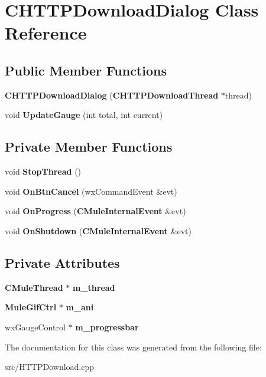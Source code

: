 \section{CHTTPDownloadDialog Class Reference}
\label{classCHTTPDownloadDialog}
\subsection*{Public Member Functions}
\begin{DoxyCompactItemize}
\item 
{\bfseries CHTTPDownloadDialog} ({\bf CHTTPDownloadThread} $\ast$thread)\label{classCHTTPDownloadDialog_a201947c2f3bcbb60b24ea949c01bcfc7}

\item 
void {\bfseries UpdateGauge} (int total, int current)\label{classCHTTPDownloadDialog_a53f214130b7fbd10adab705232944e73}

\end{DoxyCompactItemize}
\subsection*{Private Member Functions}
\begin{DoxyCompactItemize}
\item 
void {\bfseries StopThread} ()\label{classCHTTPDownloadDialog_aa8225bc54bb46089ce1eefecf2e7798e}

\item 
void {\bfseries OnBtnCancel} (wxCommandEvent \&evt)\label{classCHTTPDownloadDialog_a7e635d0a1f2bfa49fc7999e5d825c1f4}

\item 
void {\bfseries OnProgress} ({\bf CMuleInternalEvent} \&evt)\label{classCHTTPDownloadDialog_ae791676246cf8a86861481bf356d8ef9}

\item 
void {\bfseries OnShutdown} ({\bf CMuleInternalEvent} \&evt)\label{classCHTTPDownloadDialog_a19163aef94d4787bbfc0c7c32116f27e}

\end{DoxyCompactItemize}
\subsection*{Private Attributes}
\begin{DoxyCompactItemize}
\item 
{\bf CMuleThread} $\ast$ {\bfseries m\_\-thread}\label{classCHTTPDownloadDialog_a2ebd6f85269526a8cc949cfc6e5d763a}

\item 
{\bf MuleGifCtrl} $\ast$ {\bfseries m\_\-ani}\label{classCHTTPDownloadDialog_a04e7ece421530a271f50e7bf7d20d9ca}

\item 
wxGaugeControl $\ast$ {\bfseries m\_\-progressbar}\label{classCHTTPDownloadDialog_a2007fd3b5d738c82f7172e6378eb2e7a}

\end{DoxyCompactItemize}


The documentation for this class was generated from the following file:\begin{DoxyCompactItemize}
\item 
src/HTTPDownload.cpp\end{DoxyCompactItemize}
